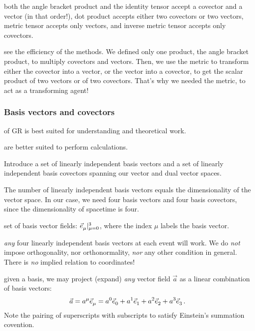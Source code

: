  both the angle bracket product and the identity tensor accept a covector and a vector (in that order!), dot product accepts either two covectors or two vectors, metric tensor accepts only vectors, and inverse metric tensor accepts only covectors.

 see the efficiency of the methods. We defined only one product, the angle bracket product, to multiply covectors and vectors. Then, we use the metric to transform either the covector into a vector, or the vector into a covector, to get the scalar product of two vectors or of two covectors. That's why we needed the metric, to act as a transforming agent!


\subsubsection{Basis vectors and covectors}
%
 of GR is best suited for understanding and theoretical work.

 are better suited to perform calculations.

 Introduce a set of linearly independent basis vectors and a set of linearly independent basis covectors spanning our vector and dual vector spaces.

 The number of linearly independent basis vectors equals the dimensionality of the vector space. In our case, we need four basis vectors and four basis covectors, since the dimensionality of spacetime is four.

 set of basis vector fields: $\bset{\tbvec\mu}{\mu = 0}{3}$, where the index $\mu$ labels the basis vector.

 \emph{any} four linearly independent basis vectors at each event will work. We do \emph{not} impose orthogonality, nor orthonormality, \emph{nor} any other condition in general. There is \emph{no} implied relation to coordinates!

 given a basis, we may project (expand) \emph{any} vector field $\vec a$ as a linear combination of basis vectors:
%
\begin{equation}\label{eq:vectorprojectiononbasisvectors}
  \vec a = \tvec a\mu\tbvec\mu
         = \tvec a0\tbvec 0 + \tvec a1\tbvec 1 + \tvec a2\tbvec 2 + \tvec a3\tbvec 3\,.
\end{equation}
%
Note the pairing of superscripts with subscripts to satisfy Einstein's summation covention.

